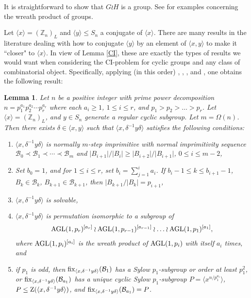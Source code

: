 \documentclass{amsart}
\newtheorem{lem}[thrm]{Lemma}
\theoremstyle{definition}
\theoremstyle{remark}
\numberwithin{equation}{section}
\def\Z{{\mathbb Z}}
\def\la{{\langle}}
\def\ra{{\rangle}}
\def\fix{{\rm fix}}
\def\AGL{{\rm AGL}}
\def\cal{\mathcal}
\def\C{{\rm Z}}
\begin{document}
It is straightforward to show that $G\wr H$ is a group.  See \cite[\S 4.2]{Book} for examples concerning the wreath product of groups.

Let $\la x\ra = (\Z_n)_L$ and $\la y\ra\le S_n$ a conjugate of $\la x\ra$.  There are many results in the literature dealing with how to conjugate $\la y\ra$ by an element of $\la x,y\ra$ to make it ``closer" to $\la x\ra$.   In view of Lemma \ref{CI}, these are exactly the types of results we would want when considering the CI-problem for cyclic groups and any class of combinatorial object.  Specifically, applying (in this order) \cite[Theorem 4.9]{Muzychuk1999}, \cite[Theorem 1.8]{Muzychuk1999}, \cite[Lemma 19]{Dobson2008a}, and \cite[Lemma 24]{Dobson2008a}, one obtains the following result:

\begin{lem}\label{already known}
Let $n$ be a positive integer with prime power decomposition $n = p_1^{a_1}p_2^{a_2}\cdots p_r^{a_r}$ where each $a_i\ge 1$, $1\le i\le r$, and $p_1 > p_2 > \ldots > p_r$.  Let $\la x\ra = (\Z_n)_L$, and $y\in S_n$ generate a regular cyclic subgroup.  Let $m = \Omega(n)$.  Then there exists $\delta\in\la x,y\ra$ such that $\la x,\delta^{-1}y\delta\ra$ satisfies the following conditions:
\begin{enumerate}
\item $\la x,\delta^{-1}y\delta\ra$ is normally $m$-step imprimitive with normal imprimitivity sequence ${\cal B}_0\prec{\cal B}_1\prec\cdots\prec{\cal B}_m$ and $\vert B_{i+1}\vert/\vert B_i\vert \ge \vert B_{i + 2}\vert/\vert B_{i + 1}\vert$, $0\le i\le m-2$,
\item Set $b_0 = 1$, and for $1\le i\le r$, set $b_i = \sum_{j=1}^ia_i$.  If $b_i - 1\le k\le b_{i + 1} - 1$, $B_k\in{\cal B}_k$, $B_{k + 1}\in{\cal B}_{k+1}$, then $\vert B_{k+1}/\vert B_k\vert = p_{i + 1}$,
\item $\la x,\delta^{-1}y\delta\ra$ is solvable,
\item $\la x,\delta^{-1}y\delta\ra$ is permutation isomorphic to a subgroup of $$\AGL(1,p_r)^{[a_r]}\wr\AGL(1,p_{r-1})^{[a_{r-1}]}\wr\ldots\wr\AGL(1,p_1)^{[a_1]},$$ where $\AGL(1,p_i)^{[a_i]}$ is the wreath product of $\AGL(1,p_i)$ with itself $a_i$ times, and
\item\label{part 5} if $p_1$ is odd, then $\fix_{\la x,\delta^{-1}y\delta\ra}({\cal B}_1)$ has a Sylow $p_1$-subgroup or order at least $p_1^2$, or $\fix_{\la x,\delta^{-1}y\delta\ra}({\cal B}_{a_1})$ has a unique cyclic Sylow $p_1$-subgroup $P = \la x^{n/p_1^{a_1}}\ra$, $P\le\C(\la x,\delta^{-1}y\delta\ra)$, and $\fix_{\la x,\delta^{-1}y\delta\ra}({\cal B}_{a_1}) = P$.
\end{enumerate}
\end{lem}
\end{document}
